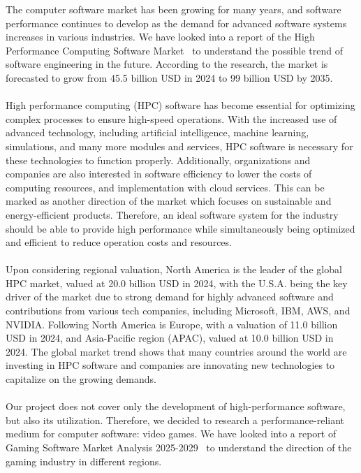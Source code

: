 The computer software market has been growing for many years, and software performance continues to develop 
as the demand for advanced software systems increases in various industries.
We have looked into a report of the High Performance Computing Software Market~\cite{HPC_Software_Market_Research} to
understand the possible trend of software engineering in the future.
According to the research, the market is forecasted to grow from 45.5 billion USD in 2024 to 99 billion USD by 2035.
\\\\
High performance computing (HPC) software has become essential for optimizing complex processes to ensure high-speed operations.
With the increased use of advanced technology, including artificial intelligence, machine learning, simulations, and many more 
modules and services, HPC software is necessary for these technologies to function properly.
Additionally, organizations and companies are also interested in software efficiency to lower the costs of computing resources, 
and implementation with cloud services.
This can be marked as another direction of the market which focuses on sustainable and energy-efficient products.
Therefore, an ideal software system for the industry should be able to provide high performance while simultaneously being 
optimized and efficient to reduce operation costs and resources.
\\\\
Upon considering regional valuation, North America is the leader of the global HPC market, valued at 20.0 billion USD in 2024, 
with the U.S.A. being the key driver of the market due to strong demand for highly advanced software and contributions from 
various tech companies, including Microsoft, IBM, AWS, and NVIDIA.
Following North America is Europe, with a valuation of 11.0 billion USD in 2024, and Asia-Pacific region (APAC), valued at 
10.0 billion USD in 2024.
The global market trend shows that many countries around the world are investing in HPC software and companies are innovating 
new technologies to capitalize on the growing demands.
\\\\
Our project does not cover only the development of high-performance software, but also its utilization.
Therefore, we decided to research a performance-reliant medium for computer software: video games.
We have looked into a report of Gaming Software Market Analysis 2025-2029~\cite{Gaming_Software_Market_Analysis} to understand the direction of 
the gaming industry in different regions.
